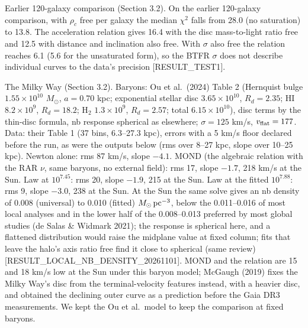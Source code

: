 \documentclass[
  10pt,
]{article}
\begin{document}
Earlier 120-galaxy comparison (Section 3.2). On the earlier 120-galaxy comparison, with $\rho_c$ free per galaxy the median $\chi^2$ falls from 28.0 (no saturation) to 13.8. The acceleration relation gives 16.4 with the disc mass-to-light ratio free and 12.5 with distance and inclination also free. With $\sigma$ also free the relation reaches 6.1 (5.6 for the unsaturated form), so the BTFR $\sigma$ does not describe individual curves to the data's precision {[}RESULT\_TEST1{]}.

The Milky Way (Section 3.2). Baryons: Ou et al.~(2024) Table 2 (Hernquist bulge $1.55\times10^{10}$ $M_\odot$, $a=0.70$ kpc; exponential stellar disc $3.65\times10^{10}$, $R_d=2.35$; HI $8.2\times10^{9}$, $R_d=18.2$; H$_2$ $1.3\times10^{9}$, $R_d=2.57$; total $6.15\times10^{10}$), disc terms by the thin-disc formula, nb response spherical as elsewhere; $\sigma=125$ km/s, $v_{\rm flat}=177$. Data: their Table 1 (37 bins, 6.3--27.3 kpc), errors with a 5 km/s floor declared before the run, as were the outputs below (rms over 8--27 kpc, slope over 10--25 kpc). Newton alone: rms 87 km/s, slope $-4.1$. MOND (the algebraic relation with the RAR $\nu$, same baryons, no external field): rms 17, slope $-1.7$, 218 km/s at the Sun. Law at $10^{7.45}$: rms 20, slope $-1.9$, 215 at the Sun. Law at the fitted $10^{7.88}$: rms 9, slope $-3.0$, 238 at the Sun. At the Sun the same solve gives an nb density of 0.008 (universal) to 0.010 (fitted) $M_\odot\,{\rm pc}^{-3}$, below the 0.011--0.016 of most local analyses and in the lower half of the 0.008--0.013 preferred by most global studies (de Salas \& Widmark 2021); the response is spherical here, and a flattened distribution would raise the midplane value at fixed column; fits that leave the halo's axis ratio free find it close to spherical (same review) {[}RESULT\_LOCAL\_NB\_DENSITY\_20261101{]}. MOND and the relation are 15 and 18 km/s low at the Sun under this baryon model; McGaugh (2019) fixes the Milky Way's disc from the terminal-velocity features instead, with a heavier disc, and obtained the declining outer curve as a prediction before the Gaia DR3 measurements. We kept the Ou et al.\ model to keep the comparison at fixed baryons.
\end{document}
